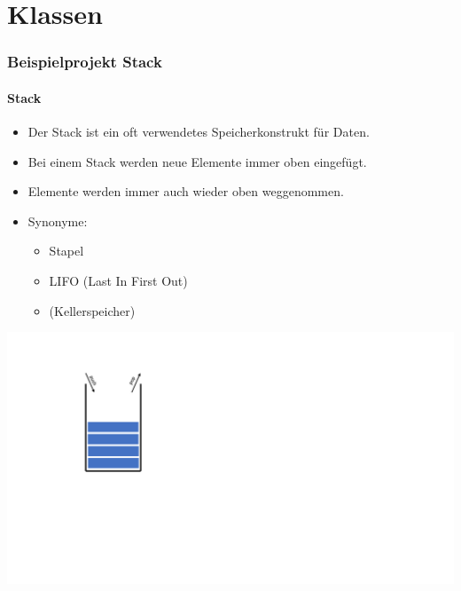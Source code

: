 

\part{Klassen}

\section{Beispielprojekt Stack}

\begin{multicols}{2}
\subsection{Stack}
\begin{minipage}{0.8\linewidth}
	\begin{itemize}
		\item Der Stack ist ein oft verwendetes Speicherkonstrukt für Daten.
		\item Bei einem Stack werden neue Elemente immer oben eingefügt.
		\item Elemente werden immer auch wieder oben weggenommen.
		\item Synonyme:
		\begin{itemize}
			\item Stapel
			\item LIFO (Last In First Out)
			\item (Kellerspeicher)
		\end{itemize}
	\end{itemize}
\end{minipage}%
\begin{minipage}{0.2\linewidth}
	\includegraphics[width=\linewidth]{images/klasse1.pdf}
\end{minipage}
\vfill\null
\columnbreak

\end{multicols}
